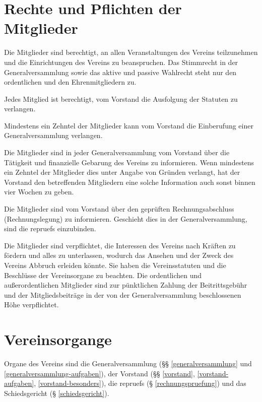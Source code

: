 \documentclass{article}
\begin{document}
\section{Rechte und Pflichten der Mitglieder}
\begin{absatz}
    \item Die Mitglieder sind berechtigt, an allen Veranstaltungen des Vereins teilzunehmen und die Einrichtungen des Vereins zu beanspruchen. Das Stimmrecht in der Generalversammlung sowie das aktive und passive Wahlrecht steht nur den ordentlichen und den Ehrenmitgliedern zu.
    \item Jedes Mitglied ist berechtigt, vom Vorstand die Ausfolgung der Statuten zu verlangen.
    \item Mindestens ein Zehntel der Mitglieder kann vom Vorstand die Einberufung einer Generalversammlung verlangen.
    \item Die Mitglieder sind in jeder Generalversammlung vom Vorstand über die Tätigkeit und finanzielle Gebarung des Vereins zu informieren. Wenn mindestens ein Zehntel der Mitglieder dies unter Angabe von Gründen verlangt, hat der Vorstand den betreffenden Mitgliedern eine solche Information auch sonst binnen vier Wochen zu geben.
    \item Die Mitglieder sind vom Vorstand über den geprüften Rechnungsabschluss (Rechnungslegung) zu informieren. Geschieht dies in der Generalversammlung, sind die \glspl{repruef} einzubinden.
    \item Die Mitglieder sind verpflichtet, die Interessen des Vereins nach Kräften zu fördern und alles zu unterlassen, wodurch das Ansehen und der Zweck des Vereins Abbruch erleiden könnte. Sie haben die Vereinsstatuten und die Beschlüsse der Vereinsorgane zu beachten. Die ordentlichen und außerordentlichen Mitglieder sind zur pünktlichen Zahlung der Beitrittsgebühr und der Mitgliedsbeiträge in der von der Generalversammlung beschlossenen Höhe verpflichtet.
\end{absatz}



\section{Vereinsorgange}
Organe des Vereins sind die Generalversammlung (§§ \ref{generalversammlung} und \ref{generalversammlung-aufgaben}), der Vorstand (§§ \ref{vorstand}, \ref{vorstand-aufgaben}, \ref{vorstand-besonders}), die \glspl{repruef} (§ \ref{rechnungspruefung}) und das Schiedsgericht (§ \ref{schiedsgericht}).
\end{document}
